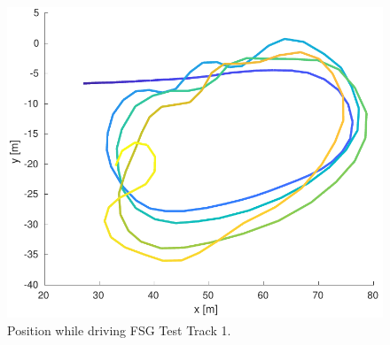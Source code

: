 \begin{figure}
    \centering
    \includegraphics[width=0.8\linewidth]{0_Images/6_Results/positionFSGTestTrack.pdf}
    \caption[Position while driving FSG Test Track 1.]
    {Position while driving FSG Test Track 1.}
    \label{Fig:PosFSGTestTrack}
\end{figure}
